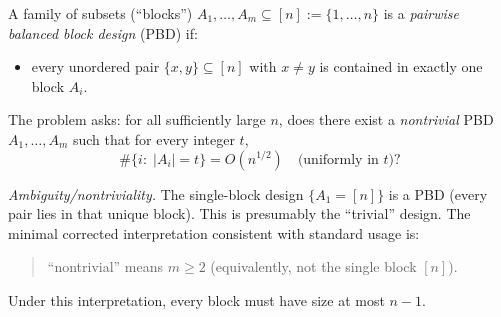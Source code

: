 A family of subsets (``blocks'') $A_1,\dots,A_m\subseteq [n]:=\{1,\dots,n\}$ is a \emph{pairwise balanced block design} (PBD) if:
\begin{itemize}
\item every unordered pair $\{x,y\}\subseteq [n]$ with $x\neq y$ is contained in exactly one block $A_i$.
\end{itemize}
The problem asks: for all sufficiently large $n$, does there exist a \emph{nontrivial} PBD $A_1,\dots,A_m$ such that for every integer $t$,
\[
\#\{i:\;|A_i|=t\}=O(n^{1/2})
\quad\text{(uniformly in $t$)}?
\]

\emph{Ambiguity/nontriviality.} The single-block design $\{A_1=[n]\}$ is a PBD (every pair lies in that unique block). This is presumably the ``trivial'' design. The minimal corrected interpretation consistent with standard usage is:
\begin{quote}
``nontrivial'' means $m\ge 2$ (equivalently, not the single block $[n]$).
\end{quote}
Under this interpretation, every block must have size at most $n-1$.
